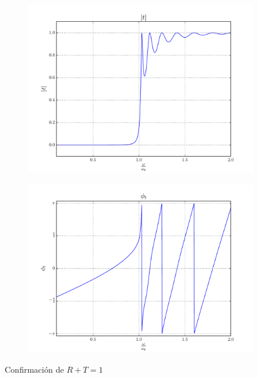 \documentclass[a4paper,11pt]{article}
\begin{document}
                            \begin{figure}[!ht]
                            \centering \includegraphics[width=0.9\textwidth]{Punto1BC/t_N.pdf}
                            \end{figure}
                            \begin{figure}[!ht]
                            \centering \includegraphics[width=0.9\textwidth]{Punto1BC/t_f.pdf}
                            \end{figure}
Confirmación de $R+T=1$
\end{document}
